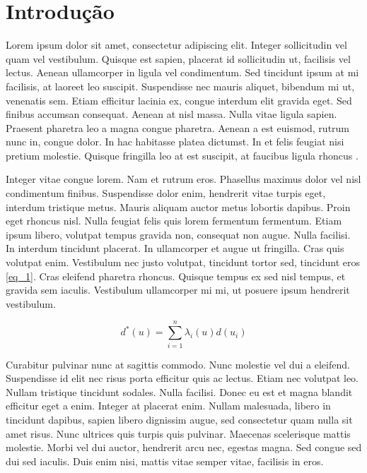 \chapter{Introdução}

Lorem ipsum dolor sit amet, consectetur adipiscing elit. Integer sollicitudin vel quam vel vestibulum. Quisque est sapien, placerat id sollicitudin ut, facilisis vel lectus. Aenean ullamcorper in ligula vel condimentum. Sed tincidunt ipsum at mi facilisis, at laoreet leo suscipit. Suspendisse nec mauris aliquet, bibendum mi ut, venenatis sem. Etiam efficitur lacinia ex, congue interdum elit gravida eget. Sed finibus accumsan consequat. Aenean at nisl massa. Nulla vitae ligula sapien. Praesent pharetra leo a magna congue pharetra. Aenean a est euismod, rutrum nunc in, congue dolor. In hac habitasse platea dictumst. In et felis feugiat nisi pretium molestie. Quisque fringilla leo at est suscipit, at faucibus ligula rhoncus \cite{goovaerts1997geostatistics}.

Integer vitae congue lorem. Nam et rutrum eros. Phasellus maximus dolor vel nisl condimentum finibus. Suspendisse dolor enim, hendrerit vitae turpis eget, interdum tristique metus. Mauris aliquam auctor metus lobortis dapibus. Proin eget rhoncus nisl. Nulla feugiat felis quis lorem fermentum fermentum. Etiam ipsum libero, volutpat tempus gravida non, consequat non augue. Nulla facilisi. In interdum tincidunt placerat. In ullamcorper et augue ut fringilla. Cras quis volutpat enim. Vestibulum nec justo volutpat, tincidunt tortor sed, tincidunt eros \ref{eq_1}. Cras eleifend pharetra rhoncus. Quisque tempus ex sed nisl tempus, et gravida sem iaculis. Vestibulum ullamcorper mi mi, ut posuere ipsum hendrerit vestibulum.

\begin{equation}
	\label{eq_1}
	d^*(u)=\sum_{i=1}^{n} \lambda_i(u) d(u_i)
\end{equation}

Curabitur pulvinar nunc at sagittis commodo. Nunc molestie vel dui a eleifend. Suspendisse id elit nec risus porta efficitur quis ac lectus. Etiam nec volutpat leo. Nullam tristique tincidunt sodales. Nulla facilisi. Donec eu est et magna blandit efficitur eget a enim. Integer at placerat enim. Nullam malesuada, libero in tincidunt dapibus, sapien libero dignissim augue, sed consectetur quam nulla sit amet risus. Nunc ultrices quis turpis quis pulvinar. Maecenas scelerisque mattis molestie. Morbi vel dui auctor, hendrerit arcu nec, egestas magna. Sed congue sed dui sed iaculis. Duis enim nisi, mattis vitae semper vitae, facilisis in eros.

